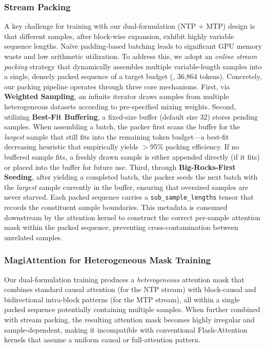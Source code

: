 \subsubsection{Stream Packing}
A key challenge for training with our dual-formulation (NTP + MTP) design is that different samples, after block-wise expansion, exhibit highly variable sequence lengths. Na\"ive padding-based batching leads to significant GPU memory waste and low arithmetic utilization. To address this, we adopt an \textit{online stream packing} strategy that dynamically assembles multiple variable-length samples into a single, densely packed sequence of a target budget (\eg, 36,864 tokens). Concretely, our packing pipeline operates through three core mechanisms. First, via \textbf{Weighted Sampling}, an infinite iterator draws samples from multiple heterogeneous datasets according to pre-specified mixing weights. Second, utilizing \textbf{Best-Fit Buffering}, a fixed-size buffer (default size 32) stores pending samples. When assembling a batch, the packer first scans the buffer for the \textit{largest} sample that still fits into the remaining token budget---a best-fit decreasing heuristic that empirically yields $>$95\% packing efficiency. If no buffered sample fits, a freshly drawn sample is either appended directly (if it fits) or placed into the buffer for future use. Third, through \textbf{Big-Rocks-First Seeding}, after yielding a completed batch, the packer seeds the next batch with the \textit{largest} sample currently in the buffer, ensuring that oversized samples are never starved. Each packed sequence carries a \texttt{sub\_sample\_lengths} tensor that records the constituent sample boundaries. This metadata is consumed downstream by the attention kernel to construct the correct per-sample attention mask within the packed sequence, preventing cross-contamination between unrelated samples.



\subsubsection{MagiAttention for Heterogeneous Mask Training}
Our dual-formulation training produces a \textit{heterogeneous} attention mask that combines standard causal attention (for the NTP stream) with block-causal and bidirectional intra-block patterns (for the MTP stream), all within a single packed sequence potentially containing multiple samples. When further combined with stream packing, the resulting attention mask becomes highly irregular and sample-dependent, making it incompatible with conventional Flash-Attention kernels that assume a uniform causal or full-attention pattern.

